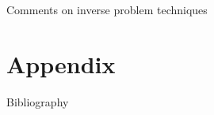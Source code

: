 \documentclass[handout]{beamer}
\begin{document}
\begin{frame}{Comments on inverse problem techniques}
\end{frame}

\section{Appendix}

\begin{frame}[allowframebreaks]{Bibliography}
    \printbibliography
\end{frame}
\end{document}
